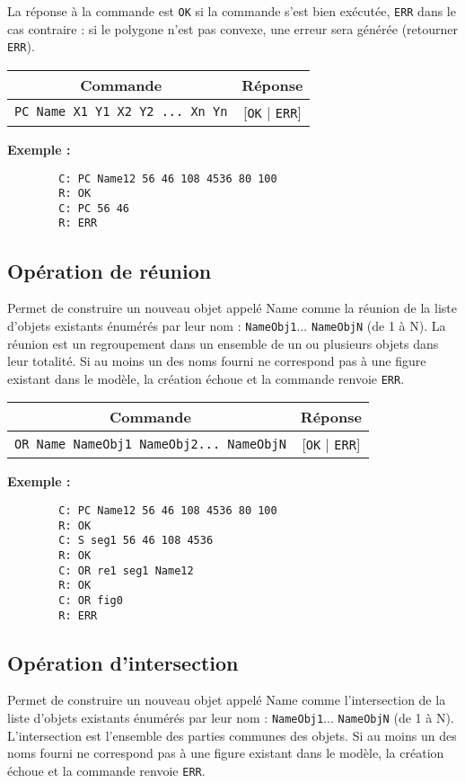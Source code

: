 \documentclass[11pt,a4paper]{article}
\begin{document}
	La réponse à la commande est \texttt{OK} si la commande s'est bien exécutée, \texttt{ERR} dans le cas contraire : si le polygone n'est pas convexe, une erreur sera générée (retourner \texttt{ERR}).
	
	\begin{center}
		\begin{tabular}[c]{|c | c|}
			\hline
			\textbf{Commande} & \textbf{Réponse} \\
			\hline
			\texttt{PC Name X1 Y1 X2 Y2 ... Xn Yn} & [\texttt{OK} | \texttt{ERR}] \\
			\hline
		\end{tabular}
	\end{center}
	
	\textbf{Exemple :}
	\begin{verbatim}
		C: PC Name12 56 46 108 4536 80 100
		R: OK
		C: PC 56 46
		R: ERR
	\end{verbatim}
	
	\subsection{Opération de réunion}
	Permet de construire un nouveau objet appelé Name comme la réunion de la liste d'objets existants énumérés par leur nom : \texttt{NameObj1}... \texttt{NameObjN} (de 1 à N). La réunion est un regroupement dans un ensemble de un ou plusieurs objets dans leur totalité. Si au moins un des noms fourni ne correspond pas à une figure existant dans le modèle, la création échoue et la commande renvoie \texttt{ERR}.
	
	\begin{center}
		\begin{tabular}[c]{|c | c|}
			\hline
			\textbf{Commande} & \textbf{Réponse} \\
			\hline
			\texttt{OR Name NameObj1 NameObj2... NameObjN} & [\texttt{OK} | \texttt{ERR}] \\
			\hline
		\end{tabular}
	\end{center}
	
	\textbf{Exemple :}
	\begin{verbatim}
		C: PC Name12 56 46 108 4536 80 100
		R: OK
		C: S seg1 56 46 108 4536
		R: OK
		C: OR re1 seg1 Name12
		R: OK
		C: OR fig0
		R: ERR
	\end{verbatim}
	
	\subsection{Opération d'intersection}
	Permet de construire un nouveau objet appelé Name comme l'intersection de la liste d'objets existants énumérés par leur nom : \texttt{NameObj1}... \texttt{NameObjN} (de 1 à N). L’intersection est l’ensemble des parties communes des objets. Si au moins un des noms fourni ne correspond pas à une figure existant dans le modèle, la création échoue et la commande renvoie \texttt{ERR}.
	
\end{document}
